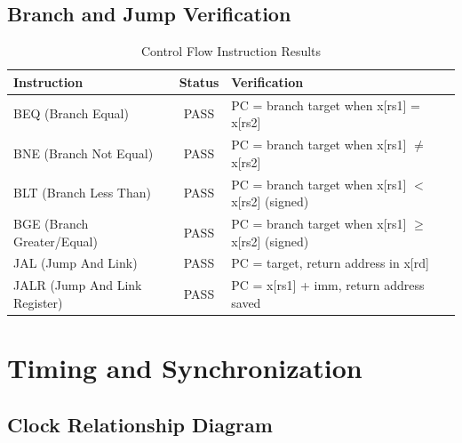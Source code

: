 \documentclass[a4paper, 11pt]{article}
\begin{document}
\subsection{Branch and Jump Verification}

\begin{table}[H]
\centering
\caption{Control Flow Instruction Results}
\begin{tabular}{|l|c|l|}
\hline
\textbf{Instruction} & \textbf{Status} & \textbf{Verification} \\
\hline
BEQ (Branch Equal) & PASS & PC = branch target when x[rs1] = x[rs2] \\
\hline
BNE (Branch Not Equal) & PASS & PC = branch target when x[rs1] $\neq$ x[rs2] \\
\hline
BLT (Branch Less Than) & PASS & PC = branch target when x[rs1] $<$ x[rs2] (signed) \\
\hline
BGE (Branch Greater/Equal) & PASS & PC = branch target when x[rs1] $\geq$ x[rs2] (signed) \\
\hline
JAL (Jump And Link) & PASS & PC = target, return address in x[rd] \\
\hline
JALR (Jump And Link Register) & PASS & PC = x[rs1] + imm, return address saved \\
\hline
\end{tabular}
\end{table}

\newpage

\section{Timing and Synchronization}

\subsection{Clock Relationship Diagram}
\end{document}
